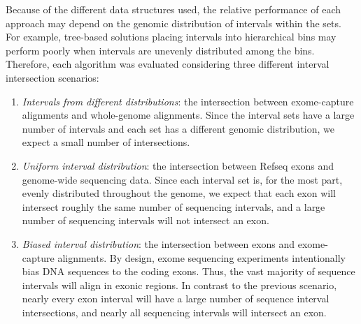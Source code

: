 \documentclass{bioinfo}
\begin{document}
        Because of the different data structures used, the relative performance of each 
        approach may depend on the genomic distribution of intervals within the sets.  For example, 
        tree-based solutions placing intervals into hierarchical bins may perform poorly when intervals are 
        unevenly distributed among the bins. Therefore, each algorithm was evaluated 
        considering three different interval intersection scenarios:

                \begin{enumerate}
                        \item

                        {\em Intervals from different distributions}: the intersection between exome-capture 
                        alignments and whole-genome alignments. Since the interval sets have a large number of intervals
                        and each set has a different genomic distribution, we expect a small number of intersections.
                        
                        \item
                        {\em Uniform interval distribution}: the intersection between 
                        Refseq exons and genome-wide sequencing data.  Since each interval set
                        is, for the most part, evenly distributed throughout the genome, we expect 
                        that each exon will intersect roughly the same number of sequencing intervals, 
                        and a large number of sequencing intervals will not intersect an exon.

                        \item
                        {\em Biased interval distribution}:  the intersection between exons and exome-capture
                        alignments.  By design, exome sequencing experiments intentionally bias DNA sequences to the coding exons.  
                        Thus, the vast majority of sequence intervals will align in exonic regions. In contrast to the previous 
                        scenario, nearly every exon interval will have a large number of sequence interval intersections, and 
                        nearly all sequencing intervals will intersect an exon.
        
                \end{enumerate}
\end{document}
